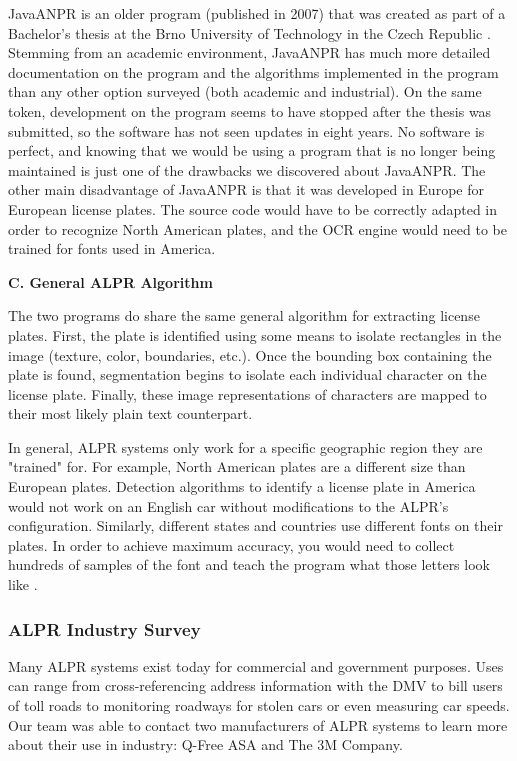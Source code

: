 \documentclass[11pt, oneside, fullpage, doublespace]{article}
\begin{document}
JavaANPR is an older program (published in 2007) that was created as part of a Bachelor's thesis at the Brno University of Technology in the Czech Republic \cite{javaanpr}. Stemming from an academic environment, JavaANPR has much more detailed documentation on the program and the algorithms implemented in the program than any other option surveyed (both academic and industrial). On the same token, development on the program seems to have stopped after the thesis was submitted, so the software has not seen updates in eight years. No software is perfect, and knowing that we would be using a program that is no longer being maintained is just one of the drawbacks we discovered about JavaANPR. The other main disadvantage of JavaANPR is that it was developed in Europe for European license plates. The source code would have to be correctly adapted in order to recognize North American plates, and the OCR engine would need to be trained for fonts used in America.

\textbf{C. General ALPR Algorithm}

The two programs do share the same general algorithm for extracting license plates. First, the plate is identified using some means to isolate rectangles in the image (texture, color, boundaries, etc.). Once the bounding box containing the plate is found, segmentation begins to isolate each individual character on the license plate. Finally, these image representations of characters are mapped to their most likely plain text counterpart.

In general, ALPR systems only work for a specific geographic region they are "trained" for. For example, North American plates are a different size than European plates. Detection algorithms to identify a license plate in America would not work on an English car without modifications to the ALPR's configuration. Similarly, different states and countries use different fonts on their plates. In order to achieve maximum accuracy, you would need to collect hundreds of samples of the font and teach the program what those letters look like \cite{nikolaos2006}.


\subsubsection{ALPR Industry Survey}
Many ALPR systems exist today for commercial and government purposes. Uses can range from cross-referencing address information with the DMV to bill users of toll roads to monitoring roadways for stolen cars or even measuring car speeds. Our team was able to contact two manufacturers of ALPR systems to learn more about their use in industry: Q-Free ASA and The 3M Company.
\end{document}
